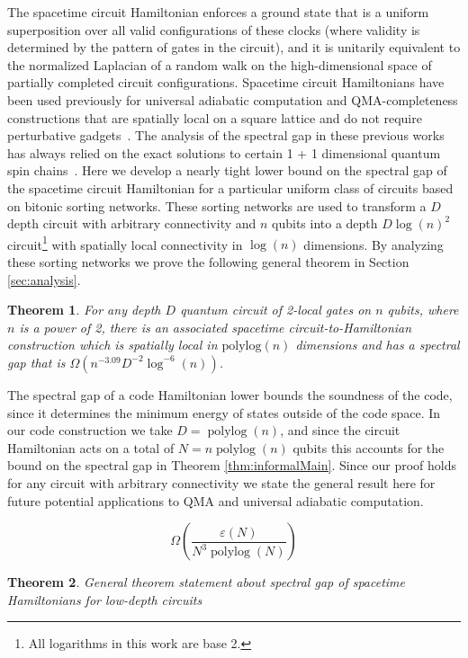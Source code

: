 \documentclass[11pt,letterpaper]{article}
\newtheorem{theorem}{Theorem}[section]
\theoremstyle{definition}
\theoremstyle{remark}
\DeclareMathOperator{\polylog}{polylog}
\numberwithin{equation}{section}
\theoremstyle{definition}
\begin{document}
The spacetime circuit Hamiltonian enforces a ground state that is a uniform superposition over all valid configurations of these clocks (where validity is determined by the pattern of gates in the circuit), and it is unitarily equivalent to the normalized Laplacian of a random walk on the high-dimensional space of partially completed circuit configurations.  Spacetime circuit Hamiltonians have been used previously for universal adiabatic computation and QMA-completeness constructions that are spatially local on a square lattice and do not require perturbative gadgets~\cite{breuckmann2014space,PhysRevLett.114.140501,lloyd2016adiabatic}.  The analysis of the spectral gap in these previous works has always relied on the exact solutions to certain 1 + 1 dimensional quantum spin chains~\cite{koma1997spectral}.  Here we develop a nearly tight lower bound on the spectral gap of the spacetime circuit Hamiltonian for a particular uniform class of circuits based on bitonic sorting networks.   These sorting networks are used to transform a $D$ depth circuit with arbitrary connectivity and $n$ qubits into a depth $D \log(n)^2$ circuit\footnote{All logarithms in this work are base 2.} with spatially local connectivity in $\log(n)$ dimensions.    By analyzing these sorting networks we prove the following general theorem in Section \ref{sec:analysis}.
\begin{theorem}\label{thm:spacetimeGeneralResult}
For any depth $D$ quantum circuit of 2-local gates on $n$ qubits, where $n$ is a power of 2, there is an associated spacetime circuit-to-Hamiltonian construction which is spatially local in $\textrm{polylog}(n)$ dimensions and has a spectral gap that is $\Omega(n^{-3.09} D^{-2} \log^{-6}(n))$.
\end{theorem}

The spectral gap of a code Hamiltonian lower bounds the soundness of the code, since it determines the minimum energy of states outside of the code space.  In our code construction we take $D = \polylog(n)$, and since the circuit Hamiltonian acts on a total of $N = n \polylog(n)$ qubits this accounts for the bound on the spectral gap in Theorem \ref{thm:informalMain}.  Since our proof holds for any circuit with arbitrary connectivity we state the general result here for future potential applications to QMA and universal adiabatic computation.  
\iffalse


$$
\Omega \left(\frac{\varepsilon(N)}{N^3 \polylog(N)} \right)
$$
\begin{theorem}
General theorem statement about spectral gap of spacetime Hamiltonians for low-depth circuits
\end{theorem}
\end{document}
